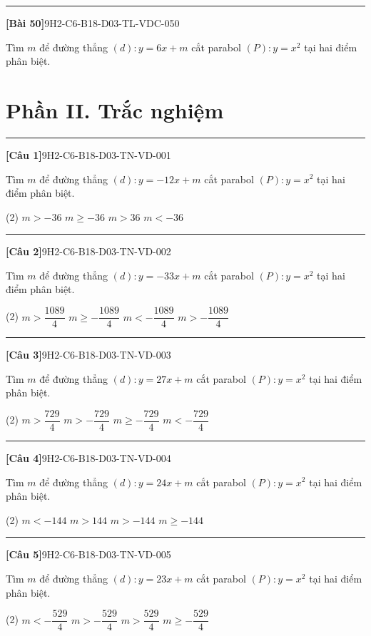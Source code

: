 \documentclass[12pt,a4paper]{article}
\newif\ifloigiai
\newenvironment{cauhoi}[2]{%
  \par\medskip\noindent\rule{\textwidth}{0.4pt}\par\nopagebreak
  \noindent\textbf{[#1]}\hfill{\scriptsize\ttfamily #2}\par\nopagebreak\smallskip}{\par}
\newcommand{\loigiai}[1]{\ifloigiai\par\smallskip\noindent\textit{Lời giải.} #1\par\fi}
\newcommand{\dapan}[1]{\ifloigiai\par\smallskip\noindent\textit{Đáp án:} \textbf{#1}\par\fi}
\begin{document}
\begin{cauhoi}{Bài 50}{9H2-C6-B18-D03-TL-VDC-050}
Tìm $m$ để đường thẳng $(d): y=6x+m$ cắt parabol $(P): y=x^{2}$ tại hai điểm phân biệt.
\loigiai{Phương trình hoành độ giao điểm $x^{2}-6x-m=0$. Để $(d)$ cắt $(P)$ tại hai điểm phân biệt cần $\Delta=36+4m>0$, suy ra $m>-9$.}
\end{cauhoi}
\clearpage\section*{Phần II. Trắc nghiệm}
\begin{cauhoi}{Câu 1}{9H2-C6-B18-D03-TN-VD-001}
Tìm $m$ để đường thẳng $(d): y=-12x+m$ cắt parabol $(P): y=x^{2}$ tại hai điểm phân biệt.
\begin{tasks}(2)
\task $m>-36$
\task $m\ge -36$
\task $m>36$
\task $m<-36$
\end{tasks}
\dapan{A}
\end{cauhoi}
\begin{cauhoi}{Câu 2}{9H2-C6-B18-D03-TN-VD-002}
Tìm $m$ để đường thẳng $(d): y=-33x+m$ cắt parabol $(P): y=x^{2}$ tại hai điểm phân biệt.
\begin{tasks}(2)
\task $m>\dfrac{1089}{4}$
\task $m\ge -\dfrac{1089}{4}$
\task $m<-\dfrac{1089}{4}$
\task $m>-\dfrac{1089}{4}$
\end{tasks}
\dapan{D}
\end{cauhoi}
\begin{cauhoi}{Câu 3}{9H2-C6-B18-D03-TN-VD-003}
Tìm $m$ để đường thẳng $(d): y=27x+m$ cắt parabol $(P): y=x^{2}$ tại hai điểm phân biệt.
\begin{tasks}(2)
\task $m>\dfrac{729}{4}$
\task $m>-\dfrac{729}{4}$
\task $m\ge -\dfrac{729}{4}$
\task $m<-\dfrac{729}{4}$
\end{tasks}
\dapan{B}
\end{cauhoi}
\begin{cauhoi}{Câu 4}{9H2-C6-B18-D03-TN-VD-004}
Tìm $m$ để đường thẳng $(d): y=24x+m$ cắt parabol $(P): y=x^{2}$ tại hai điểm phân biệt.
\begin{tasks}(2)
\task $m<-144$
\task $m>144$
\task $m>-144$
\task $m\ge -144$
\end{tasks}
\dapan{C}
\end{cauhoi}
\begin{cauhoi}{Câu 5}{9H2-C6-B18-D03-TN-VD-005}
Tìm $m$ để đường thẳng $(d): y=23x+m$ cắt parabol $(P): y=x^{2}$ tại hai điểm phân biệt.
\begin{tasks}(2)
\task $m<-\dfrac{529}{4}$
\task $m>-\dfrac{529}{4}$
\task $m>\dfrac{529}{4}$
\task $m\ge -\dfrac{529}{4}$
\end{tasks}
\dapan{B}
\end{cauhoi}
\end{document}
